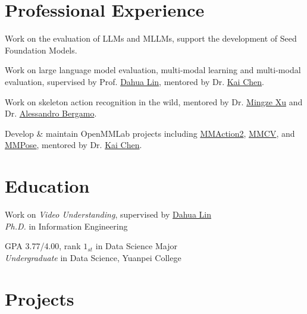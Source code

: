 \documentclass{resume}
\newcommand{\secgap}{\vspace{1mm}}%
\begin{document}
\secgap

\section{Professional Experience}

Work on the evaluation of LLMs and MLLMs, support the development of Seed Foundation Models.

Work on large language model evaluation, multi-modal learning and multi-modal evaluation, supervised by Prof. \href{https://dahua.me}{Dahua Lin}, mentored by Dr. \href{https://chenkai.site/}{Kai Chen}.

Work on skeleton action recognition in the wild, mentored by Dr. \href{https://xumingze0308.github.io/}{Mingze Xu} and Dr. \href{https://alessandrobergamo.com/}{Alessandro Bergamo}. 

Develop \& maintain OpenMMLab projects including \href{https://github.com/open-mmlab/mmaction2}{MMAction2}, \href{https://github.com/open-mmlab/mmcv}{MMCV}, and \href{https://github.com/open-mmlab/mmpose}{MMPose}, mentored by Dr. \href{https://chenkai.site/}{Kai Chen}.

\secgap

\section{Education}

Work on \textit{Video Understanding}, supervised by \href{https://dahua.me}{Dahua Lin} \\
\textit{Ph.D.} in Information Engineering 

GPA 3.77/4.00, rank $1_{st}$ in Data Science Major \\
\textit{Undergraduate} in Data Science, Yuanpei College

\secgap

\section{Projects}
\end{document}

